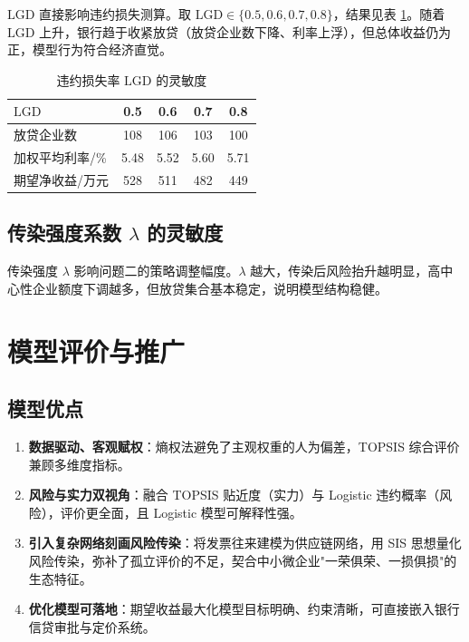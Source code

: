 \documentclass[12pt]{ctexart}
\begin{document}
$\mathrm{LGD}$ 直接影响违约损失测算。取 $\mathrm{LGD}\in\{0.5,0.6,0.7,0.8\}$，结果见表 \ref{tab:sens2}。随着 $\mathrm{LGD}$ 上升，银行趋于收紧放贷（放贷企业数下降、利率上浮），但总体收益仍为正，模型行为符合经济直觉。

\begin{table}[H]
\centering
\caption{违约损失率 $\mathrm{LGD}$ 的灵敏度}
\label{tab:sens2}
\small
\begin{tabular}{lcccc}
\toprule
$\mathrm{LGD}$ & 0.5 & 0.6 & 0.7 & 0.8 \\
\midrule
放贷企业数 & 108 & 106 & 103 & 100 \\
加权平均利率/\% & 5.48 & 5.52 & 5.60 & 5.71 \\
期望净收益/万元 & 528 & 511 & 482 & 449 \\
\bottomrule
\end{tabular}
\end{table}

\subsection{传染强度系数 $\lambda$ 的灵敏度}

传染强度 $\lambda$ 影响问题二的策略调整幅度。$\lambda$ 越大，传染后风险抬升越明显，高中心性企业额度下调越多，但放贷集合基本稳定，说明模型结构稳健。

\section{模型评价与推广}

\subsection{模型优点}

\begin{enumerate}[label=(\arabic*),itemsep=2pt]
    \item \textbf{数据驱动、客观赋权}：熵权法避免了主观权重的人为偏差，TOPSIS 综合评价兼顾多维度指标。
    \item \textbf{风险与实力双视角}：融合 TOPSIS 贴近度（实力）与 Logistic 违约概率（风险），评价更全面，且 Logistic 模型可解释性强。
    \item \textbf{引入复杂网络刻画风险传染}：将发票往来建模为供应链网络，用 SIS 思想量化风险传染，弥补了孤立评价的不足，契合中小微企业"一荣俱荣、一损俱损"的生态特征。
    \item \textbf{优化模型可落地}：期望收益最大化模型目标明确、约束清晰，可直接嵌入银行信贷审批与定价系统。
\end{enumerate}
\end{document}

